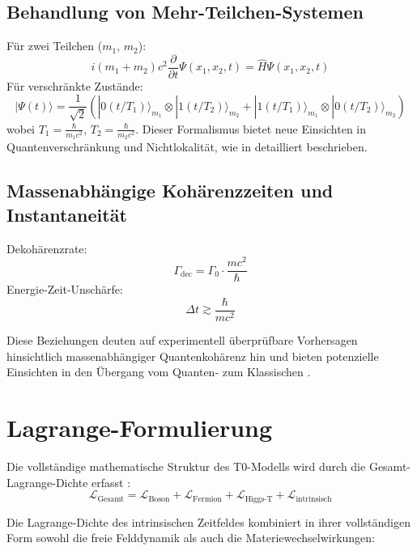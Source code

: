 \documentclass[12pt,a4paper]{article}
\begin{document}
	\subsection{Behandlung von Mehr-Teilchen-Systemen}
	Für zwei Teilchen (\( m_1 \), \( m_2 \)):
	\begin{equation}
		i (m_1 + m_2) c^2 \frac{\partial}{\partial t} \Psi(x_1, x_2, t) = \hat{H} \Psi(x_1, x_2, t)
	\end{equation}
	Für verschränkte Zustände:
	\begin{equation}
		|\Psi(t)\rangle = \frac{1}{\sqrt{2}}(|0(t/T_1)\rangle_{m_1} \otimes |1(t/T_2)\rangle_{m_2} + |1(t/T_1)\rangle_{m_1} \otimes |0(t/T_2)\rangle_{m_2})
	\end{equation}
	wobei \( T_1 = \frac{\hbar}{m_1 c^2} \), \( T_2 = \frac{\hbar}{m_2 c^2} \). Dieser Formalismus bietet neue Einsichten in Quantenverschränkung und Nichtlokalität, wie in \cite{pascher_feldtheorie_2025} detailliert beschrieben.
	
	\subsection{Massenabhängige Kohärenzzeiten und Instantaneität}
	Dekohärenzrate:
	\begin{equation}
		\Gamma_{\text{dec}} = \Gamma_0 \cdot \frac{m c^2}{\hbar}
	\end{equation}
	Energie-Zeit-Unschärfe:
	\begin{equation}
		\Delta t \gtrsim \frac{\hbar}{mc^2}
	\end{equation}
	
	Diese Beziehungen deuten auf experimentell überprüfbare Vorhersagen hinsichtlich massenabhängiger Quantenkohärenz hin und bieten potenzielle Einsichten in den Übergang vom Quanten- zum Klassischen \cite{pascher_erweiterung_2025}.
\section{Lagrange-Formulierung}
Die vollständige mathematische Struktur des T0-Modells wird durch die Gesamt-Lagrange-Dichte erfasst \cite{pascher_lagrange_2025}:
\begin{equation}
	\mathcal{L}_{\text{Gesamt}} = \mathcal{L}_{\text{Boson}} + \mathcal{L}_{\text{Fermion}} + \mathcal{L}_{\text{Higgs-T}} + \mathcal{L}_{\text{intrinsisch}}
\end{equation}

Die Lagrange-Dichte des intrinsischen Zeitfeldes kombiniert in ihrer vollständigen Form sowohl die freie Felddynamik als auch die Materiewechselwirkungen:
\end{document}
